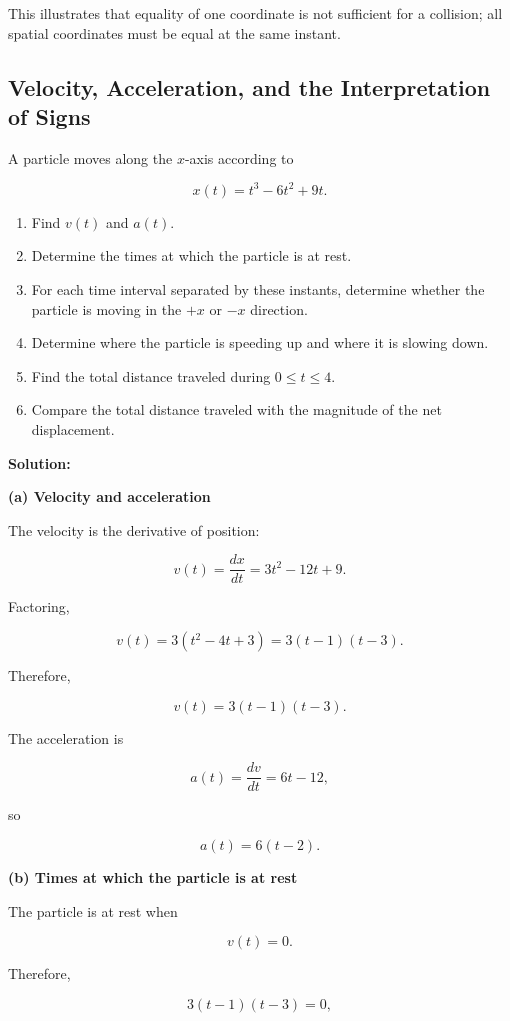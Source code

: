 \documentclass[12pt]{article}
\theoremstyle{remark}
\begin{document}
This illustrates that equality of one coordinate is not sufficient for a collision; all spatial coordinates must be equal at the same instant.


\subsection{Velocity, Acceleration, and the Interpretation of Signs}

A particle moves along the \(x\)-axis according to

\[
x(t)=t^3-6t^2+9t.
\]

\begin{enumerate}
    \item Find \(v(t)\) and \(a(t)\).
    \item Determine the times at which the particle is at rest.
    \item For each time interval separated by these instants, determine whether the particle is moving in the \(+x\) or \(-x\) direction.
    \item Determine where the particle is speeding up and where it is slowing down.
    \item Find the total distance traveled during \(0\leq t\leq 4\).
    \item Compare the total distance traveled with the magnitude of the net displacement.
\end{enumerate}

\textbf{Solution:}

\textbf{(a) Velocity and acceleration}

The velocity is the derivative of position:

\[
v(t)=\frac{dx}{dt}
=
3t^2-12t+9.
\]

Factoring,

\[
v(t)=3(t^2-4t+3)
=
3(t-1)(t-3).
\]

Therefore,

\[
\boxed{
v(t)=3(t-1)(t-3).
}
\]

The acceleration is

\[
a(t)=\frac{dv}{dt}
=
6t-12,
\]

so

\[
\boxed{
a(t)=6(t-2).
}
\]

\textbf{(b) Times at which the particle is at rest}

The particle is at rest when

\[
v(t)=0.
\]

Therefore,

\[
3(t-1)(t-3)=0,
\]
\end{document}
